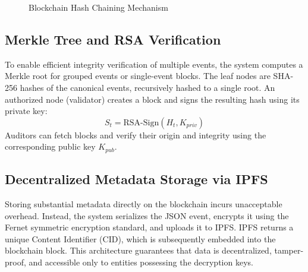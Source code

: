 \documentclass[conference]{IEEEtran}
\begin{document}
\begin{figure}[htbp]
  \centering
  \caption{Blockchain Hash Chaining Mechanism}
  \label{fig:blockchain}
\end{figure}

\subsection{Merkle Tree and RSA Verification}
To enable efficient integrity verification of multiple events, the system computes a Merkle root for grouped events or single-event blocks. The leaf nodes are SHA-256 hashes of the canonical events, recursively hashed to a single root.
An authorized node (validator) creates a block and signs the resulting hash using its private key:
\begin{equation}
    S_t = \text{RSA-Sign}(H_t, K_{priv})
\end{equation}
Auditors can fetch blocks and verify their origin and integrity using the corresponding public key $K_{pub}$.

\subsection{Decentralized Metadata Storage via IPFS}
Storing substantial metadata directly on the blockchain incurs unacceptable overhead. Instead, the system serializes the JSON event, encrypts it using the Fernet symmetric encryption standard, and uploads it to IPFS. IPFS returns a unique Content Identifier (CID), which is subsequently embedded into the blockchain block. This architecture guarantees that data is decentralized, tamper-proof, and accessible only to entities possessing the decryption keys.
\end{document}
